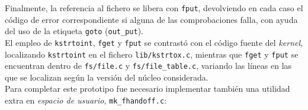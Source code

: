 Finalmente, la referencia al fichero se libera con \verb|fput|, devolviendo en cada caso el código de error correspondiente si alguna de las comprobaciones falla, con ayuda del uso de la etiqueta \verb|goto| (\verb|out_put|).\\

El empleo de \verb|kstrtoint|, \verb|fget| y \verb|fput| se contrastó con el código fuente del \textit{kernel}, localizando \verb|kstrtoint| en el fichero \texttt{lib/kstrtox.c}, mientras que \verb|fget| y \verb|fput| se encuentran dentro de \texttt{fs/file.c} y \texttt{fs/file\_table.c}, variando las líneas en las que se localizan según la versión del núcleo considerada.\\

Para completar este prototipo fue necesario implementar también una utilidad extra en \textit{espacio de usuario}, \texttt{mk\_fhandoff.c}:

